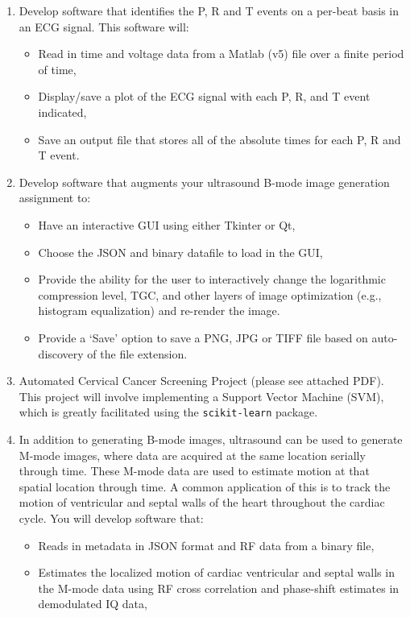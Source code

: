 \begin{itemize}
    \begin{enumerate}
        \item Develop software that identifies the P, R and T events on a per-beat basis in an ECG signal.  This software will:
        \begin{itemize}
            \item Read in time and voltage data from a Matlab (v5) file over a finite period of time,
            \item Display/save a plot of the ECG signal with each P, R, and T event indicated,
            \item Save an output file that stores all of the absolute times for each P, R and T event.
        \end{itemize}
        \item Develop software that augments your ultrasound B-mode image generation assignment to:
        \begin{itemize}
            \item Have an interactive GUI using either Tkinter or Qt,
            \item Choose the JSON and binary datafile to load in the GUI,
            \item Provide the ability for the user to interactively change the logarithmic compression level, TGC, and other layers of image optimization (e.g., histogram equalization) and re-render the image.
            \item Provide a `Save' option to save a PNG, JPG or TIFF file based on auto-discovery of the file extension.
        \end{itemize}
        \item Automated Cervical Cancer Screening Project (please see attached PDF).  This project will involve implementing a Support Vector Machine (SVM), which is greatly facilitated using the \verb+scikit-learn+ package.
        \item In addition to generating B-mode images, ultrasound can be used to generate M-mode images, where data are acquired at the same location serially through time.  These M-mode data are used to estimate motion at that spatial location through time.  A common application of this is to track the motion of ventricular and septal walls of the heart throughout the cardiac cycle.  You will develop software that:
        \begin{itemize}
            \item Reads in metadata in JSON format and RF data from a binary file,
            \item Estimates the localized motion of cardiac ventricular and septal walls in the M-mode data using RF cross correlation and phase-shift estimates in demodulated IQ data,

\end{itemize}
\end{enumerate}
\end{itemize}
